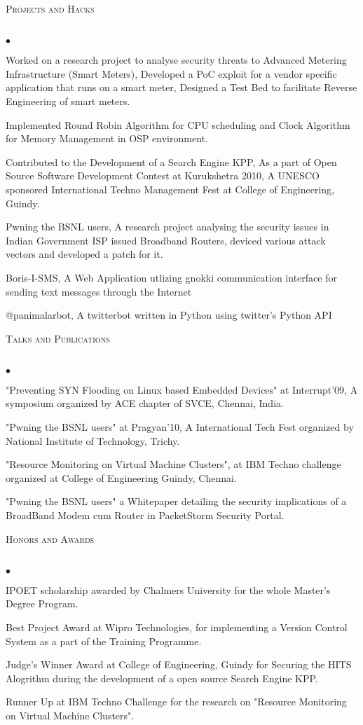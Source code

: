\documentclass{article}
\newcommand{\lineunder}{\vspace*{-8pt} \\ \hspace*{-18pt} \hrulefill \\}
\newcommand{\header}[1]{{\hspace*{-15pt}\vspace*{6pt} \textsc{#1}} \vspace*{-6pt} \lineunder}
\newenvironment{achievements}{\begin{list}{$\bullet$}{\topsep 0pt \itemsep -2pt}}{\vspace*{4pt}\end{list}}
\begin{document}
\header{Projects and Hacks}
\begin{achievements}
\item Worked on a research project to analyse security threats to Advanced Metering Infrastructure (Smart Meters), Developed a PoC exploit for a vendor specific application that runs on a smart meter, Designed a Test Bed to facilitate Reverse Engineering of smart meters.
\item Implemented Round Robin Algorithm for CPU scheduling and Clock Algorithm for Memory Management in OSP environment.
\item Contributed to the Development of a Search Engine KPP, As a part of Open Source Software Development Contest at Kurukshetra 2010, A UNESCO sponsored International Techno Management Fest at College of Engineering, Guindy.
\item Pwning the BSNL users, A research project analysing the security issues in Indian Government ISP issued Broadband Routers, deviced various attack vectors and developed a patch for it.
\item Boris-I-SMS, A Web Application utlizing gnokki communication interface for sending text messages through the Internet
\item @panimalarbot, A twitterbot written in Python using twitter's Python API
\end{achievements}
\newpage
\header{Talks and Publications}
\begin{achievements}
\item "Preventing SYN Flooding on Linux based Embedded Devices" at Interrupt'09, A symposium organized by ACE chapter of SVCE, Chennai, India.
\item "Pwning the BSNL users" at Pragyan'10, A International Tech Fest organized by National Institute of Technology, Trichy.
\item "Resource Monitoring on Virtual Machine Clusters", at IBM Techno challenge organized at College of Engineering Guindy, Chennai.
\item "Pwning the BSNL users" a Whitepaper detailing the security implications of a BroadBand Modem cum Router in PacketStorm Security Portal.
\end{achievements}

\header{Honors and Awards}
\begin{achievements}
\item IPOET scholarship awarded by Chalmers University for the whole Master's Degree Program.
\item Best Project Award at Wipro Technologies, for implementing a Version Control System as a part of the Training Programme.
\item Judge's Winner Award at College of Engineering, Guindy for Securing the HITS Alogrithm during the development of a open source Search Engine KPP.
\item Runner Up at IBM Techno Challenge for the research on "Resource Monitoring on Virtual Machine Clusters".
\end{achievements}
\end{document}

